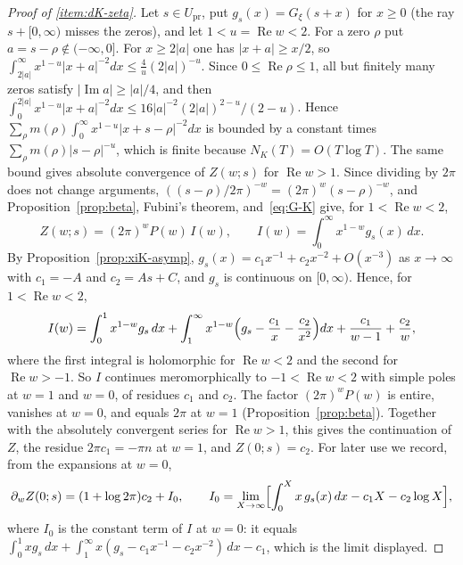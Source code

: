 \documentclass[11pt]{amsart}
\theoremstyle{plain}
\theoremstyle{definition}
\theoremstyle{remark}
\numberwithin{equation}{section}
\DeclareMathOperator{\Ima}{Im}
\DeclareMathOperator{\Rea}{Re}
\renewcommand{\Re}{\Rea}
\renewcommand{\Im}{\Ima}
\begin{document}
\begin{proof}[Proof of \ref{item:dK-zeta}]
Let $s\in U_{\mathrm{pr}}$, put $g_s(x)=G_\xi(s+x)$ for $x\ge0$ (the
ray $s+[0,\infty)$ misses the zeros), and let $1<u=\Re w<2$. For a zero
$\rho$ put $a=s-\rho\notin(-\infty,0]$. For $x\ge2|a|$ one has
$|x+a|\ge x/2$, so $\int_{2|a|}^\infty x^{1-u}|x+a|^{-2}dx\le
\tfrac4u(2|a|)^{-u}$. Since $0\le\Re\rho\le1$, all but finitely many
zeros satisfy $|\Im a|\ge|a|/4$, and then
$\int_0^{2|a|}x^{1-u}|x+a|^{-2}dx\le16|a|^{-2}(2|a|)^{2-u}/(2-u)$.
Hence $\sum_\rho m(\rho)\int_0^\infty x^{1-u}|x+s-\rho|^{-2}dx$ is
bounded by a constant times $\sum_\rho m(\rho)|s-\rho|^{-u}$, which is
finite because $N_K(T)=O(T\log T)$. The same bound gives absolute
convergence of $Z(w;s)$ for $\Re w>1$. Since dividing by $2\pi$ does
not change arguments, $((s-\rho)/2\pi)^{-w}=(2\pi)^w(s-\rho)^{-w}$, and
Proposition~\ref{prop:beta}, Fubini's theorem, and~\eqref{eq:G-K} give,
for $1<\Re w<2$,
\[
Z(w;s)=(2\pi)^wP(w)\,I(w),\qquad I(w)=\int_0^\infty x^{1-w}g_s(x)\,dx.
\]
By Proposition~\ref{prop:xiK-asymp}, $g_s(x)=c_1x^{-1}+c_2x^{-2}
+O(x^{-3})$ as $x\to\infty$ with $c_1=-A$ and $c_2=As+C$, and $g_s$ is
continuous on $[0,\infty)$. Hence, for $1<\Re w<2$,
\[
I(w)=\int_0^1x^{1-w}g_s\,dx+\int_1^\infty x^{1-w}\Bigl(g_s-\frac{c_1}x
-\frac{c_2}{x^2}\Bigr)dx+\frac{c_1}{w-1}+\frac{c_2}w,
\]
where the first integral is holomorphic for $\Re w<2$ and the second for
$\Re w>-1$. So $I$ continues meromorphically to $-1<\Re w<2$ with
simple poles at $w=1$ and $w=0$, of residues $c_1$ and $c_2$. The
factor $(2\pi)^wP(w)$ is entire, vanishes at $w=0$, and equals $2\pi$ at
$w=1$ (Proposition~\ref{prop:beta}). Together with the absolutely
convergent series for $\Re w>1$, this gives the continuation of $Z$,
the residue $2\pi c_1=-\pi n$ at $w=1$, and $Z(0;s)=c_2$. For later use
we record, from the expansions at $w=0$,
\begin{equation}\label{eq:dZ0}
\partial_wZ(0;s)=(1+\log2\pi)c_2+I_0,\qquad
I_0=\lim_{X\to\infty}\Bigl[\int_0^Xx\,g_s(x)\,dx-c_1X-c_2\log X\Bigr],
\end{equation}
where $I_0$ is the constant term of $I$ at $w=0$: it equals
$\int_0^1xg_s\,dx+\int_1^\infty x(g_s-c_1x^{-1}-c_2x^{-2})\,dx-c_1$,
which is the limit displayed.
\end{proof}
\end{document}
